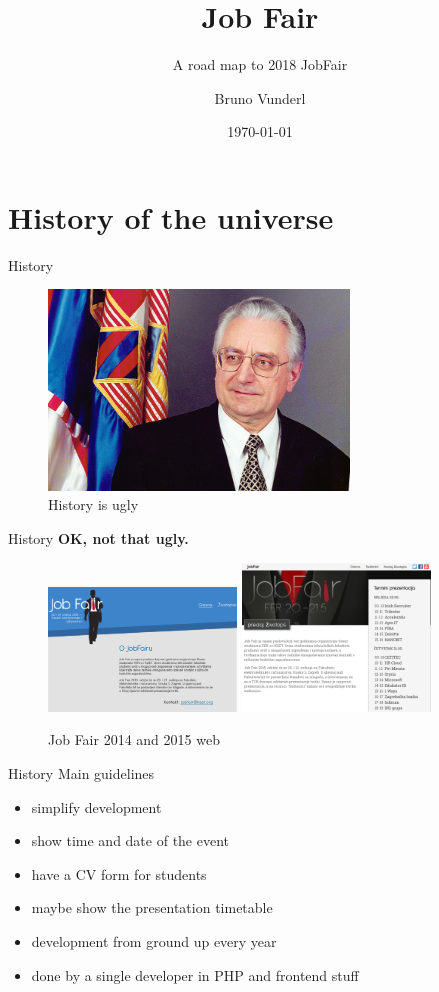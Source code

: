 \documentclass{beamer}
\title{Job Fair}
\subtitle{A road map to 2018 JobFair}
\date{\today}
\author{Bruno Vunderl}
\institute{Klub studenata elektrotehnike}
\begin{document}
	\maketitle
	
	\section{History of the universe}
	
	\begin{frame}{History}
		\begin{figure}
			\includegraphics[width=8cm]{francek}
			\caption{History is ugly}
		\end{figure}
	\end{frame}
	
	\begin{frame}{History}
		\centering
		\textbf{OK, not that ugly.}
		\begin{figure}
			\includegraphics[width=5cm]{jf-14}
			\vspace{1cm}
			\includegraphics[width=5cm]{jf-15}
			\caption{Job Fair 2014 and 2015 web}
		\end{figure}
	\end{frame}

	\begin{frame}{History}
		Main guidelines
		\begin{itemize}
			\item simplify development
			\item show time and date of the event
			\item have a CV form for students
			\item maybe show the presentation timetable
			\item development from ground up every year
			\item done by a single developer in PHP and frontend stuff
		\end{itemize}
	\end{frame}
\end{document}
